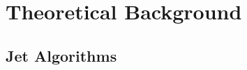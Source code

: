 \chapter{Theoretical Background}
\label{chap:Theory}
\section{Jet Algorithms}
\label{sec:jet_algos}
\cleardoublepage

\begin{comment}
Predictions at NLO accuracy in pQCD are computed with the \NLOJETPP
program version~4.1.3~\cite{Nagy:2001fj,Nagy:2003tz}. The results are
provided within the framework of \fastNLO
version~2.3~\cite{Britzger:2012bs} for use within fits. The
renormalization and factorization scales \mur and \muf are chosen
equal to \httwo. PDF sets at NLO available for a series of different
assumptions on \alpsmz via the \LHAPDFS package~\cite{Buckley:2014ana}
are listed in Table~\ref{tab:chap2:nlopdfsets}. All sets employ a
variable-flavour number scheme with at most five or six flavours apart
from the ABM11 PDFs, which use a fixed-flavour number scheme with
$\NF=5$.

Out of these eight PDF sets the following three will not be considered
further:
%
\begin{itemize}
\item At NLO, predictions based on ABM11 do not describe LHC jet data
  at small jet rapidity, cf.\ Refs.~\cite{Aad:2013lpa, Aad:2014vwa,
    CMS:2014mna, Khachatryan:2015luy}.
\item The HERAPDF2.0 set exclusively fits HERA DIS data with only weak
  constraints on the gluon PDF\@.
\item The range in values available for \alpsmz is too limited for the
  NNPDF3.0 set.
\end{itemize}
%

PDF uncertainties are evaluated according to the prescriptions given
for each PDF set. Uncertainties on \alpsmz are not considered, since
this value is later on determined from a fit to the data. The PDF
uncertainty as derived with the CT10 PDF set ranges from 2\% to 30\%
for inclusive 2- and 3-jet cross sections and from 2\% to 7\% for \ratio.


\end{comment}
